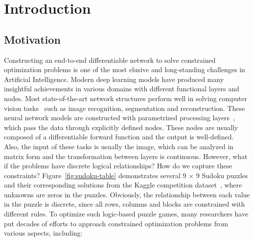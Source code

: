 \chapter{Introduction}
\label{cha:intro}

\section{Motivation}
\label{sec:motivation}
Constructing an end-to-end differentiable network to solve constrained optimization problems is one of the most elusive
and long-standing challenges in Artificial Intelligence.  Modern deep learning models have produced many insightful achievements in various domains with different functional layers and nodes. Most state-of-the-art network structures perform well in solving computer vision tasks~\citep{SK:14, HK:16, SM:18} such as image recognition, segmentation and reconstruction. These neural network models are constructed with parametrized processing layers~\citep{SG:19}, which pass the data through explicitly defined nodes. These nodes are usually composed of a differentiable forward function and the output is well-defined. Also, the input of these tasks is usually the image, which can be analyzed in matrix form and the transformation between layers is continuous. However, what if the problems have discrete logical relationships? How do we capture these constraints? Figure~\ref{fig:sudoku-table} demonstrates several 9 $\times$ 9 Sudoku puzzles and their corresponding solutions from the Kaggle competition dataset~\citep{RR:19}, where unknowns are zeros in the puzzles. Obviously, the relationship between each value in the puzzle is discrete, since all rows, columns and blocks are constrained with different rules. To optimize such logic-based puzzle games, many researchers have put decades of efforts to approach constrained optimization problems from various aspects, including:
